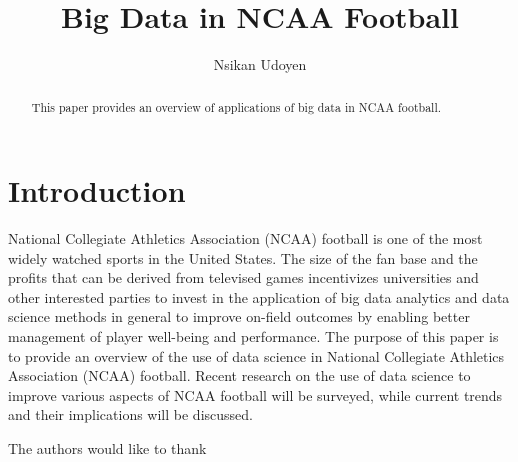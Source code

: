 \documentclass[sigconf]{acmart}
\begin{document}
\title{Big Data in NCAA Football}


\author{Nsikan Udoyen}

\renewcommand{\shortauthors}{N. Udoyen et al.}


\begin{abstract}
This paper provides an overview of applications of big data in NCAA football.
\end{abstract}



\maketitle

\section{Introduction}

National Collegiate Athletics Association (NCAA) football is one of the most widely watched sports in the United States. The size of the fan base and the profits that can be derived from televised games incentivizes universities and other interested parties to invest in the application of big data analytics and data science methods in general to improve on-field outcomes by enabling better management of player well-being and performance. The purpose of this paper is to provide an overview of the use of data science in National Collegiate Athletics Association (NCAA) football. Recent research on the use of data science to improve various aspects of NCAA football will be surveyed, while current trends and their implications will be discussed. 


\begin{acks}

  The authors would like to thank 

\end{acks}


 
\end{document}
